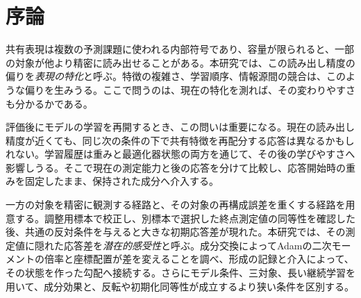 \graphicspath{{../figures/}}
\begin{abstract}
現在の特化から、追加学習によって共有表現がどう変わるかを予測できるだろうか。本研究は、平均的な読み出し測定値が同等になる二つの学習履歴を構成し、共通の反対条件への応答を比較する。中心となる二対象実験では、より精密に読み出せる対象が10更新以内に切り替わる割合は、取得経路で67.5\%、更新経路で0\%だった。Adamの二次モーメントを交換すると応答差は反転し、平均的な適応倍率を共通にしても配置の効果が残った。層別交換と移動量の制御は、全体の更新幅だけでは説明できない効果を特定した。形成中の記録は、小さいencoder二次モーメントと対象間の勾配の強い相殺を結びつけた。前向きの勾配射影実験はこの保持状態を変え、その二次モーメントだけを固定した学習器へ移すと10更新の適応応答が小さくなった。同等終点の比較は三Gaussian対象へ広がった一方、部屋のセンサ実験では成分効果が残っても終点一致は成立しなかった。検証した条件では、成分効果は反転や初期化同等性より広く成立した。以上は、選択した現在の測定値に隠れた適応に対して、最適化器状態の構造が因果的に作用し、その大きさと持続時間が学習条件に依存することを示す。

\end{abstract}

\section{序論}
\label{sec:intro}
共有表現は複数の予測課題に使われる内部符号であり、容量が限られると、一部の対象が他より精密に読み出せることがある。本研究では、この読み出し精度の偏りを\emph{表現の特化}と呼ぶ。特徴の複雑さ、学習順序、情報源間の競合は、このような偏りを生みうる\citep{lampinen2024biased,pezeshki2021gradient,huang2022modality}。ここで問うのは、現在の特化を測れば、その変わりやすさも分かるかである。

評価後にモデルの学習を再開するとき、この問いは重要になる。現在の読み出し精度が近くても、同じ次の条件の下で共有特徴を再配分する応答は異なるかもしれない。学習履歴は重みと最適化器状態の両方を通じて、その後の学びやすさへ影響しうる\citep{achille2019critical,lyle2023plasticity,dohare2024plasticity}。そこで現在の測定能力と後の応答を分けて比較し、応答開始時の重みを固定したまま、保持された成分へ介入する。

一方の対象を精密に観測する経路と、その対象の再構成誤差を重くする経路を用意する。調整用標本で校正し、別標本で選択した終点測定値の同等性を確認した後、共通の反対条件を与えると大きな初期応答差が現れた。本研究では、その測定値に隠れた応答差を\emph{潜在的感受性}と呼ぶ。成分交換によってAdamの二次モーメントの倍率と座標配置が差を変えることを調べ、形成の記録と介入によって、その状態を作った勾配へ接続する。さらにモデル条件、三対象、長い継続学習を用いて、成分効果と、反転や初期化同等性が成立するより狭い条件を区別する。

